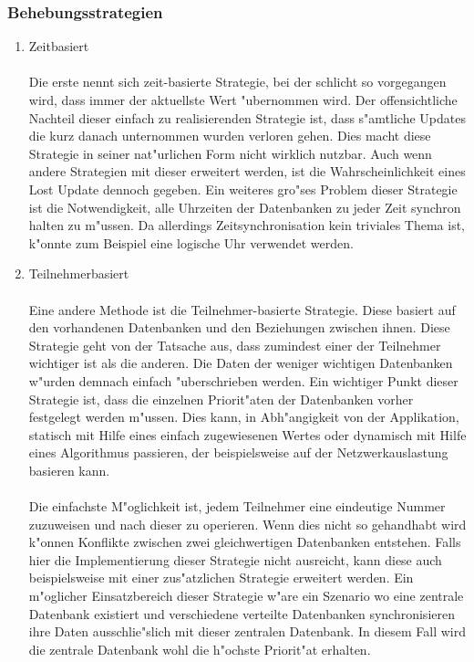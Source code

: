 \documentclass[a4paper,14pt]{scrreprt}
\begin{document}
\subsubsection{Behebungsstrategien}
\begin{enumerate}
\item Zeitbasiert \\\\Die erste nennt sich zeit-basierte Strategie, bei der schlicht so vorgegangen wird, dass immer der aktuellste Wert "ubernommen wird. Der offensichtliche Nachteil dieser einfach zu realisierenden Strategie ist, dass s"amtliche Updates die kurz danach unternommen wurden verloren gehen. Dies macht diese Strategie in seiner nat"urlichen Form nicht wirklich nutzbar. Auch wenn andere Strategien mit dieser erweitert werden, ist die Wahrscheinlichkeit eines Lost Update dennoch gegeben. Ein weiteres gro"ses Problem dieser Strategie ist die Notwendigkeit, alle Uhrzeiten der Datenbanken zu jeder Zeit synchron halten zu m"ussen. Da allerdings Zeitsynchronisation kein triviales Thema ist, k"onnte zum Beispiel eine logische Uhr verwendet werden.
\item Teilnehmerbasiert\\\\Eine andere Methode ist die Teilnehmer-basierte Strategie. Diese basiert auf den vorhandenen Datenbanken und den Beziehungen zwischen ihnen. Diese Strategie geht von der Tatsache aus, dass zumindest einer der Teilnehmer wichtiger ist als die anderen. Die Daten der weniger wichtigen Datenbanken w"urden demnach einfach "uberschrieben werden. Ein wichtiger Punkt dieser Strategie ist, dass die einzelnen Priorit"aten der Datenbanken vorher festgelegt werden m"ussen. Dies kann, in Abh"angigkeit von der Applikation, statisch mit Hilfe eines einfach zugewiesenen Wertes oder dynamisch mit Hilfe eines Algorithmus passieren, der beispielsweise auf der Netzwerkauslastung basieren kann. \\\\Die einfachste M"oglichkeit ist, jedem Teilnehmer eine eindeutige Nummer zuzuweisen und nach dieser zu operieren. Wenn dies nicht so gehandhabt wird k"onnen Konflikte zwischen zwei gleichwertigen Datenbanken entstehen. Falls hier die Implementierung dieser Strategie nicht ausreicht, kann diese auch beispielsweise mit einer zus"atzlichen Strategie erweitert werden. Ein m"oglicher Einsatzbereich dieser Strategie w"are ein Szenario wo eine zentrale Datenbank existiert und verschiedene verteilte Datenbanken synchronisieren ihre Daten ausschlie"slich mit dieser zentralen Datenbank. In diesem Fall wird die zentrale Datenbank wohl die h"ochste Priorit"at erhalten.

\end{enumerate}
\end{document}
